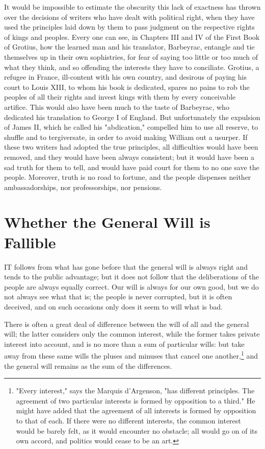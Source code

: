 \documentclass[12pt]{report}
\begin{document}
It would be impossible to estimate the obscurity this lack of exactness has thrown over the decisions of writers who have dealt with political right, when they have used the principles laid down by them to pass judgment on the respective rights of kings and peoples. Every one can see, in Chapters III and IV of the First Book of Grotius, how the learned man and his translator, Barbeyrac, entangle and tie themselves up in their own sophistries, for fear of saying too little or too much of what they think, and so offending the interests they have to conciliate. Grotius, a refugee in France, ill-content with his own country, and desirous of paying his court to Louis XIII, to whom his book is dedicated, spares no pains to rob the peoples of all their rights and invest kings with them by every conceivable artifice. This would also have been much to the taste of Barbeyrac, who dedicated his translation to George I of England. But unfortunately the expulsion of James II, which he called his "abdication," compelled him to use all reserve, to shuffle and to tergiversate, in order to avoid making William out a usurper. If these two writers had adopted the true principles, all difficulties would have been removed, and they would have been always consistent; but it would have been a sad truth for them to tell, and would have paid court for them to no one save the people. Moreover, truth is no road to fortune, and the people dispenses neither ambassadorships, nor professorships, nor pensions.

\section{Whether the General Will is Fallible}
IT follows from what has gone before that the general will is always right and tends to the public advantage; but it does not follow that the deliberations of the people are always equally correct. Our will is always for our own good, but we do not always see what that is; the people is never corrupted, but it is often deceived, and on such occasions only does it seem to will what is bad.

There is often a great deal of difference between the will of all and the general will; the latter considers only the common interest, while the former takes private interest into account, and is no more than a sum of particular wills: but take away from these same wills the pluses and minuses that cancel one another,\footnote{"Every interest," says the Marquis d'Argenson, "has different principles. The agreement of two particular interests is formed by opposition to a third." He might have added that the agreement of all interests is formed by opposition to that of each. If there were no different interests, the common interest would be barely felt, as it would encounter no obstacle; all would go on of its own accord, and politics would cease to be an art.} and the general will remains as the sum of the differences.
\end{document}
